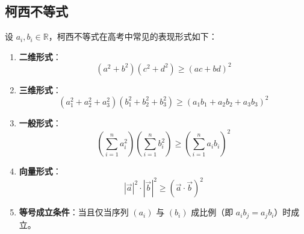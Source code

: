 \subsection{柯西不等式}

\Conclusion

设 \(a_i, b_i \in \mathbb{R}\)，柯西不等式在高考中常见的表现形式如下：

\begin{enumerate}
    \item \textbf{二维形式}：
    \[ (a^2 + b^2)(c^2 + d^2) \geq (ac + bd)^2 \]

    \item \textbf{三维形式}：
    \[ (a_1^2 + a_2^2 + a_3^2)(b_1^2 + b_2^2 + b_3^2) \geq (a_1b_1 + a_2b_2 + a_3b_3)^2 \]

    \item \textbf{一般形式}：
    \[ \left(\sum_{i=1}^n a_i^2\right)\left(\sum_{i=1}^n b_i^2\right) \geq \left(\sum_{i=1}^n a_i b_i\right)^2 \]

    \item \textbf{向量形式}：
    \[ |\vec{a}|^2 \cdot |\vec{b}|^2 \geq (\vec{a} \cdot \vec{b})^2 \]

    \item \textbf{等号成立条件}：当且仅当序列 \((a_i)\) 与 \((b_i)\) 成比例（即 \(a_i b_j = a_j b_i\)）时成立。
\end{enumerate}